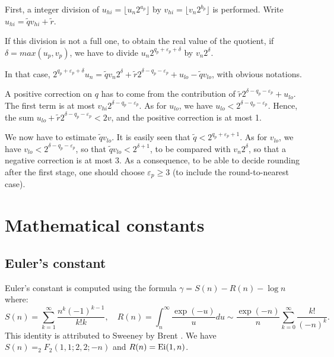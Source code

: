 \documentclass[12pt]{amsart}
\begin{document}
First, a integer division of $u_{hi} = \lfloor 
u_n 2^{a_p} \rfloor$ by 
$v_{hi} = \lfloor v_n 2^{b_p} \rfloor$ 
is performed. Write $u_{hi} = \tilde{q} v_{hi} + \tilde{r}$. 

If this division is not a full one, to obtain the real value 
of the quotient, if $\delta = max(u_p, v_p)$, we have to 
divide $u_n 2^{q_p + \varepsilon_p + \delta}$ by 
$v_n 2^{\delta}$. 

In that case, $2^{q_p + \varepsilon_p + \delta} u_n = \tilde{q}v_n
2^{\delta} + \tilde{r} 2^{\delta - q_p - \varepsilon_p} + u_{lo} -
\tilde{q}v_{lo}$, with obvious notations.

A positive correction on $q$ has to come from the contribution of 
$\tilde{r} 2^{\delta - q_p - \varepsilon_p} + u_{lo}$. The
first term is at most $v_{hi} 2^{\delta - q_p - \varepsilon_p}$.
As for $u_{lo}$, we have $u_{lo} < 2^{\delta-q_p-\varepsilon_p}$. Hence, 
the sum $u_{lo} + \tilde{r} 2^{\delta - q_p - \varepsilon_p} < 2v$, 
and the positive correction is at most 1. 

We now have to estimate $\tilde{q}v_{lo}$. It is easily seen that 
$\tilde{q} < 2^{q_p + \varepsilon_p + 1}$. As for $v_{lo}$, we have
$v_{lo} < 2^{\delta - q_p - \varepsilon_p}$, so that 
$\tilde{q} v_{lo} < 2^{\delta + 1}$, to be compared with $v_n 2^{\delta}$, 
so that a negative correction is at most 3. As a consequence, to be able
to decide rounding after the first stage, one should choose 
$\varepsilon_p \geq 3$ (to include the round-to-nearest case). 

\section{Mathematical constants}

\subsection{Euler's constant}

Euler's constant is computed using the formula $\gamma = S(n) - R(n) - \log n$
where:
\[ S(n) = \sum_{k=1}^{\infty} \frac{n^k (-1)^{k-1}}{k! k}, \quad
   R(n) = \int_n^{\infty} \frac{\exp(-u)}{u} du \sim \frac{\exp(-n)}{n}
        \sum_{k=0}^{\infty} \frac{k!}{(-n)^k}. \]
This identity is attributed to Sweeney by Brent \cite{Brent78}.
We have $S(n) = _2 F_2(1,1;2,2;-n)$ and $R(n) = {\rm Ei}(1, n)$.
\end{document}
